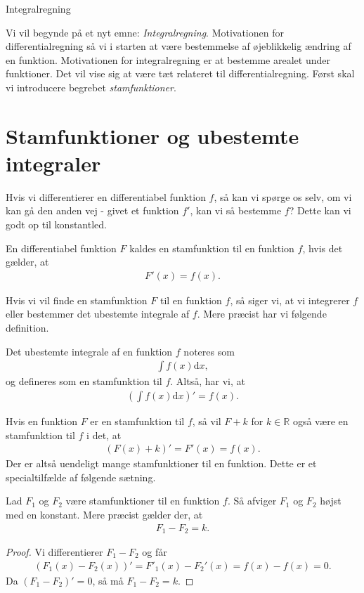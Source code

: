 
\begin{center}
\Huge
Integralregning
\end{center}
Vi vil begynde på et nyt emne: \textit{Integralregning}. Motivationen for differentialregning så vi i starten at være bestemmelse af øjeblikkelig ændring af en funktion. Motivationen for integralregning er at bestemme arealet under funktioner. Det vil vise sig at være tæt relateret til differentialregning. Først skal vi introducere begrebet \textit{stamfunktioner}.
\section*{Stamfunktioner og ubestemte integraler}
Hvis vi differentierer en differentiabel funktion $f$, så kan vi spørge os selv, om vi kan gå den anden vej - givet et funktion $f'$, kan vi så bestemme $f$? Dette kan vi godt op til konstantled. 
\begin{defn}[Stamfunktion]
En differentiabel funktion $F$ kaldes en stamfunktion til en funktion $f$, hvis det gælder, at 
\begin{align*}
F'(x) = f(x).
\end{align*}
\end{defn}
Hvis vi vil finde en stamfunktion $F$ til en funktion $f$, så siger vi, at vi integrerer $f$ eller bestemmer det ubestemte integrale af $f$. Mere præcist har vi følgende definition.
\begin{defn}
Det ubestemte integrale af en funktion $f$ noteres som
\begin{align*}
\int f(x) \text{d}x,
\end{align*}
og defineres som en stamfunktion til $f$. Altså, har vi, at 
\begin{align*}
\left(\int f(x)\text{d}x\right)' = f(x).
\end{align*}
\end{defn} 
Hvis en funktion $F$ er en stamfunktion til $f$, så vil $F+k$ for $k\in \mathbb{R}$ også være en stamfunktion til $f$ i det, at 
\begin{align*}
(F(x)+k)' = F'(x) = f(x).
\end{align*}
Der er altså uendeligt mange stamfunktioner til en funktion. Dette er et specialtilfælde af følgende sætning.
\begin{setn}
Lad $F_1$ og $F_2$ være stamfunktioner til en funktion $f$. Så afviger $F_1$ og $F_2$ højst med en konstant. Mere præcist gælder der, at 
\begin{align*}
F_1-F_2 = k.
\end{align*}
\end{setn}
\begin{proof}
Vi differentierer $F_1-F_2$ og får
\begin{align*}
(F_1(x)-F_2(x))' = F'_1(x)-F_2'(x) = f(x)-f(x) = 0.
\end{align*}
Da $(F_1-F_2)' = 0$, så må $F_1-F_2=k$.  
\end{proof}

